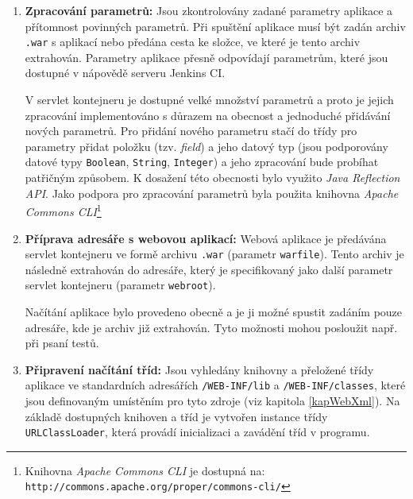             \begin{enumerate}
                \item \textbf{Zpracování parametrů:} Jsou zkontrolovány zadané parametry
                    aplikace a přítomnost povinných parametrů. Při spuštění aplikace
                    musí být zadán archiv \texttt{.war} s aplikací nebo předána cesta
                    ke složce, ve které je tento archiv extrahován. 
                    Parametry aplikace
                    přesně odpovídají parametrům, které jsou dostupné v nápovědě 
                    serveru Jenkins CI. 
                    
                    V servlet kontejneru je dostupné velké množství parametrů a
                    proto je jejich zpracování implementováno s důrazem na obecnost a jednoduché
                    přidávání nových parametrů. 
                    Pro přidání nového parametru stačí do třídy pro parametry přidat položku (tzv. \emph{field})
                    a jeho datový typ (jsou podporovány datové typy \texttt{Boolean}, \texttt{String}, 
                    \texttt{Integer}) a jeho zpracování bude probíhat patřičným
                    způsobem. K dosažení této obecnosti bylo využito \emph{Java Reflection API}.
                    Jako podpora pro zpracování parametrů byla použita knihovna \emph{Apache
                    Commons CLI}\footnote{Knihovna \emph{Apache Commons CLI} je 
                    dostupná na: \texttt{http://commons.apache.org/proper/commons-cli/}}
                    
                \item \textbf{Příprava adresáře s webovou aplikací:}  Webová aplikace
                    je předávána servlet kontejneru ve formě 
                    archivu \texttt{.war} (parametr \texttt{warfile}). Tento archiv je následně extrahován do 
                    adresáře, který je specifikovaný jako další parametr servlet kontejneru (parametr \texttt{webroot}).
                    
                    Načítání aplikace bylo provedeno obecně a je ji možné spustit zadáním
                    pouze adresáře, kde je archiv již extrahován. Tyto možnosti mohou posloužit
                    např. při psaní testů.

                \item \textbf{Připravení načítání tříd:} Jsou vyhledány knihovny 
                    a přeložené třídy aplikace ve standardních adresářích 
                    \texttt{/WEB-INF/lib} a \texttt{/WEB-INF/classes}, které jsou definovaným
                    umístěním pro tyto zdroje (viz kapitola \ref{kapWebXml}). 
                    Na základě dostupných knihoven a tříd je vytvořen instance třídy \texttt{URLClassLoader},
                    která provádí inicializaci a zavádění tříd v programu. 
                    

\end{enumerate}

